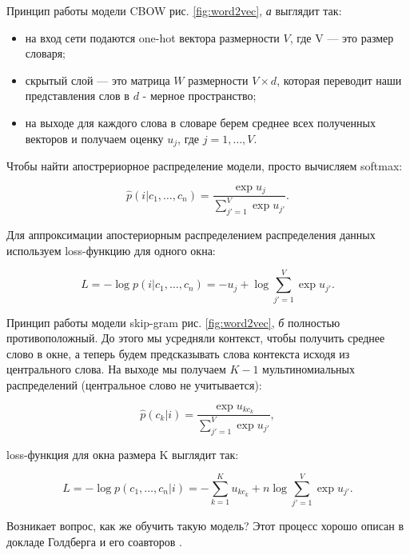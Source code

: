Принцип работы модели CBOW рис. \ref{fig:word2vec}, \textit{а}  выглядит так:

\bigskip
\begin{itemize}
 \item на вход сети подаются one-hot вектора размерности $V$, где V --- это размер словаря;
 \item скрытый слой --- это матрица $W$ размерности $V\times d$, которая переводит наши представления слов в $d$ - мерное пространство;
 \item на выходе для каждого слова в словаре берем среднее всех полученных векторов и получаем оценку $u_j$, где $j = 1, \ldots, V$.
\end{itemize}

\bigskip
Чтобы найти апострериорное распределение модели, просто вычисляем softmax:

\begin{equation}
 \hat{p}(i|c_1, \ldots, c_n) = \frac{\exp{u_j}}{\sum_{j'=1}^V \exp{u_{j'}}}.
\end{equation}

Для аппроксимации апостериорным распределением распределения данных используем loss-функцию для одного окна:

\begin{equation}
 L = -\log{p(i|c_1, \ldots, c_n)} = - u_j + \log{\sum_{j'=1}^{V} \exp{u_{j'}}}.
\end{equation}

Принцип работы модели skip-gram рис. \ref{fig:word2vec}, \textit{б} полностью противоположный. До этого мы усредняли контекст, чтобы получить среднее слово в окне, а теперь будем предсказывать слова контекста исходя из центрального слова. На выходе мы получаем $K-1$ мультиномиальных распределений (центральное слово не учитывается):

\begin{equation}
 \hat{p}(c_k|i) = \frac{\exp{u_{kc_k}}}{\sum_{j'=1}^V \exp{u_{j'}}},
\end{equation}

loss-функция для окна размера K выглядит так:

\begin{equation}
 L = -\log{p(c_1, \ldots, c_n|i)} = - \sum_{k=1}^{K} u_{kc_k} + n\log{\sum_{j'=1}^{V} \exp{u_{j'}}}.
\end{equation}

Возникает вопрос, как же обучить такую модель? Этот процесс хорошо описан в докладе Голдберга и его соавторов \cite{Goldberg}.

